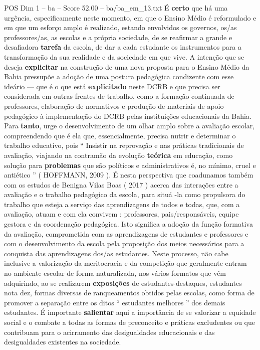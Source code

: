 \begin{textsample}{POS Dim 1 – ba – Score 52.00 – ba/ba\_em\_13.txt}
É \textbf{certo} que há uma urgência, especificamente neste momento, em que o Ensino Médio é reformulado e em que um esforço amplo é realizado, estando envolvidos os governos, os/as professores/as, as escolas e a própria sociedade, de se reafirmar a grande e desafiadora \textbf{tarefa} da escola, de dar a cada estudante os instrumentos para a transformação da sua realidade e da sociedade em que vive.
A intenção que se deseja \textbf{explicitar} na construção de uma nova proposta para o Ensino Médio da Bahia pressupõe a adoção de uma postura pedagógica condizente com esse ideário — que é o que está \textbf{explicitado} neste DCRB e que precisa ser considerada em outras frentes de trabalho, como a formação continuada de professores, elaboração de normativos e produção de materiais de apoio pedagógico à implementação do DCRB pelas instituições educacionais da Bahia.
Para \textbf{tanto}, urge o desenvolvimento de um olhar amplo sobre a avaliação escolar, compreendendo que é ela que, essencialmente, precisa nutrir e determinar o trabalho educativo, pois “ Insistir na reprovação e nas práticas tradicionais de avaliação, viajando na contramão da evolução \textbf{teórica} em educação, como solução para \textbf{problemas} que são políticos e administrativos é, no mínimo, cruel e antiético ” ( HOFFMANN, 2009 ).
É nesta perspectiva que coadunamos também com os estudos de Benigna Vilas Boas ( 2017 ) acerca das interações entre a avaliação e o trabalho pedagógico da escola, para situá -la como propulsora do trabalho que esteja a serviço das aprendizagens de todos e todas, que, com a avaliação, atuam e com ela convivem : professores, pais/responsáveis, equipe gestora e da coordenação pedagógica.
Isto significa a adoção da função formativa da avaliação, comprometida com as aprendizagens de estudantes e professores e com o desenvolvimento da escola pela proposição dos meios necessários para a conquista das aprendizagens dos/as estudantes.
Neste processo, não cabe inclusive a valorização da meritocracia e da competição que geralmente entram no ambiente escolar de forma naturalizada, nos vários formatos que vêm adquirindo, ao se realizarem \textbf{exposições} de estudantes-destaques, estudantes nota dez, formas diversas de ranqueamentos obtidos pelas escolas, como forma de promover a separação entre os ditos “ estudantes melhores ” dos demais estudantes.
É importante \textbf{salientar} aqui a importância de se valorizar a equidade social e o combate a todas as formas de preconceito e práticas excludentes ou que contribuam para o acirramento das desigualdades educacionais e das desigualdades existentes na sociedade.

\end{textsample}
